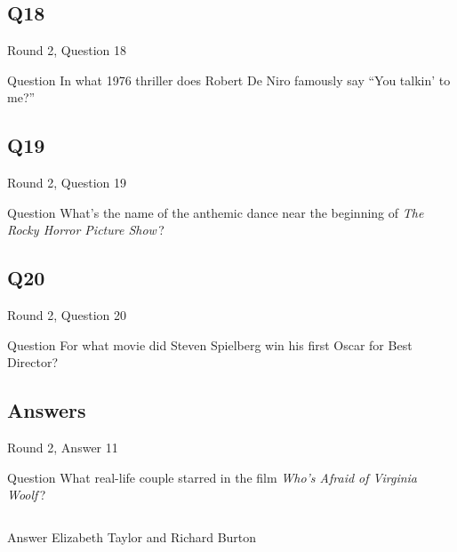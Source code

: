 \documentclass[11pt]{beamer}
\begin{document}
\subsection*{Q18}
\begin{frame}[t]{Round 2, Question 18}
  \vspace{2em}
  \begin{block}{Question}
    In what 1976 thriller does Robert De Niro famously say ``You talkin' to me?''
  \end{block}
\end{frame}


\subsection*{Q19}
\begin{frame}[t]{Round 2, Question 19}
  \vspace{2em}
  \begin{block}{Question}
    What's the name of the anthemic dance near the beginning of \emph{The Rocky Horror Picture Show}\,?
  \end{block}
\end{frame}


\subsection*{Q20}
\begin{frame}[t]{Round 2, Question 20}
  \vspace{2em}
  \begin{block}{Question}
    For what movie did Steven Spielberg win his first Oscar for Best Director?
  \end{block}
\end{frame}

\subsection{Answers}

\begin{frame}[t]{Round 2, Answer 11}
  \vspace{2em}
  \begin{block}{Question}
    What real-life couple starred in the film \emph{Who's Afraid of Virginia Woolf}\,?
  \end{block}
  \pause{}
  \begin{columns}[T,totalwidth=\linewidth]
    \begin{column}{0.35\linewidth}
      \begin{block}{Answer}
        Elizabeth Taylor and Richard Burton
      \end{block}
    \end{column}
    \begin{column}{0.6\linewidth}
      \begin{center}
        \texttt{[image: \{Images/woolf]}.jpg}
      \end{center}
    \end{column}
  \end{columns}
\end{frame}
\end{document}
